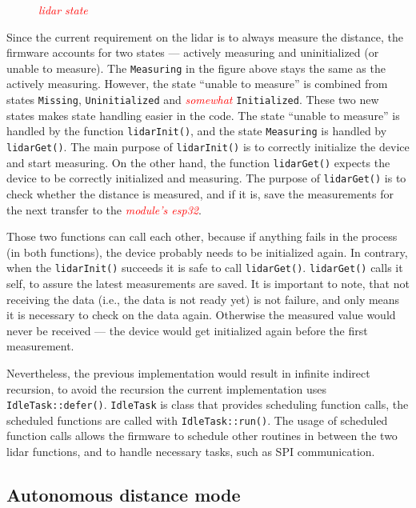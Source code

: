 \documentclass[
  digital,     %
  oneside,     %
  nosansbold,  %
  nocolorbold, %
  lof,         %
  lot,         %
]{fithesis4}
\newcommand{\TODO}[1]{\textcolor{red}{\textit{#1}}}
\begin{document}
{{{\begin{figure}[ht]
    
    \caption[Diagram of \acrshort{lidar}'s state]{\TODO{lidar state}}
    \label{fig:lidar-state}
\end{figure}

Since the current requirement on the \acrshort{lidar} is to always measure the distance, the firmware accounts for two states --- actively measuring and uninitialized (or unable to measure). The \verb|Measuring| in the figure above stays the same as the actively measuring. However, the state ``unable to measure'' is combined from states \verb|Missing|, \verb|Uninitialized| and \TODO{somewhat} \verb|Initialized|. These two new states makes state handling easier in the code. The state ``unable to measure'' is handled by the function \lstinline|lidarInit()|, and the state \verb|Measuring| is handled by \lstinline|lidarGet()|. The main purpose of \lstinline|lidarInit()| is to correctly initialize the device and start measuring. On the other hand, the function \lstinline|lidarGet()| expects the device to be correctly initialized and measuring. The purpose of \lstinline|lidarGet()| is to check whether the distance is measured, and if it is, save the measurements for the next transfer to the \TODO{module's esp32}.

Those two functions can call each other, because if anything fails in the process (in both functions), the device probably needs to be initialized again. In contrary, when the \lstinline|lidarInit()| succeeds it is safe to call \lstinline|lidarGet()|. \lstinline|lidarGet()| calls it self, to assure the latest measurements are saved. It is important to note, that not receiving the data (i.e., the data is not ready yet) is not failure, and only means it is necessary to check on the data again. Otherwise the measured value would never be received --- the device would get initialized again before the first measurement.

Nevertheless, the previous implementation would result in infinite indirect recursion, to avoid the recursion the current implementation uses \lstinline|IdleTask::defer()|. \lstinline|IdleTask| is class that provides scheduling function calls, the scheduled functions are called with \lstinline[breaklines=false]|IdleTask::run()|. The usage of scheduled function calls allows the firmware to schedule other routines in between the two lidar functions, and to handle necessary tasks, such as SPI communication.

\subsection{ Autonomous distance mode }


}}}
\end{document}
